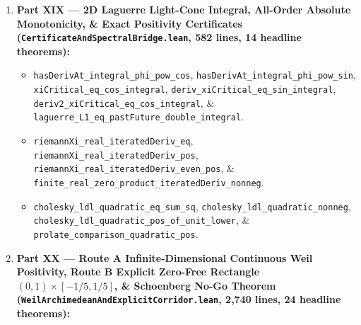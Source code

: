 \documentclass[
  11pt,
]{article}
\providecommand{\tightlist}{%
  \setlength{\itemsep}{0pt}\setlength{\parskip}{0pt}}
\begin{document}
\begin{enumerate}
  \begin{itemize}
  \tightlist
  \item
    \texttt{pos\_integral\_phi\_pow\_cosh},
    \texttt{pos\_integral\_phi\_pow\_sinh},
    \texttt{hasDerivAt\_integral\_phi\_pow\_cosh},
    \texttt{hasDerivAt\_integral\_phi\_pow\_sinh},
    \texttt{riemannXi\_real\_pos},
    \texttt{xiNormSq\_deriv\_sigma\_pos\_realAxis},
    \texttt{xiNormSq\_deriv2\_sigma\_pos\_realAxis},
    \texttt{laguerre\_L1\_pos\_at\_origin},
    \texttt{xiNormSq\_deriv3\_sigma\_pos\_realAxis},
    \texttt{exists\_unconditional\_convex\_corridor}, \&
    \texttt{exists\_unconditional\_corridor\_force\_pos\_and\_no\_offLine\_zeros}.
  \item
    \texttt{prolate\_integration\_by\_parts},
    \texttt{prolate\_symmetric}, \texttt{prolate\_quadratic\_nonneg},
    \texttt{prolate\_quadratic\_pos\_of\_ne\_zero},
    \texttt{prolate\_eigenvalue\_pos},
    \texttt{prolate\_eigenvectors\_orthogonal},
    \texttt{darboux\_supersymmetric\_factorization}, \&
    \texttt{darboux\_supersymmetric\_nonneg}.
  \end{itemize}
\item
  \textbf{Part XIX --- 2D Laguerre Light-Cone Integral, All-Order
  Absolute Monotonicity, \& Exact Positivity Certificates
  (\texttt{CertificateAndSpectralBridge.lean}, 582 lines, 14 headline
  theorems):}

  \begin{itemize}
  \tightlist
  \item
    \texttt{hasDerivAt\_integral\_phi\_pow\_cos},
    \texttt{hasDerivAt\_integral\_phi\_pow\_sin},
    \texttt{xiCritical\_eq\_cos\_integral},
    \texttt{deriv\_xiCritical\_eq\_sin\_integral},
    \texttt{deriv2\_xiCritical\_eq\_cos\_integral}, \&
    \texttt{laguerre\_L1\_eq\_pastFuture\_double\_integral}.
  \item
    \texttt{riemannXi\_real\_iteratedDeriv\_eq},
    \texttt{riemannXi\_real\_iteratedDeriv\_pos},
    \texttt{riemannXi\_real\_iteratedDeriv\_even\_pos}, \&
    \texttt{finite\_real\_zero\_product\_iteratedDeriv\_nonneg}.
  \item
    \texttt{cholesky\_ldl\_quadratic\_eq\_sum\_sq},
    \texttt{cholesky\_ldl\_quadratic\_nonneg},
    \texttt{cholesky\_ldl\_quadratic\_pos\_of\_unit\_lower}, \&
    \texttt{prolate\_comparison\_quadratic\_pos}.
  \end{itemize}
\item
  \textbf{Part XX --- Route A Infinite-Dimensional Continuous Weil
  Positivity, Route B Explicit Zero-Free Rectangle
  \((0, 1) \times [-1/5, 1/5]\), \& Schoenberg No-Go Theorem
  (\texttt{WeilArchimedeanAndExplicitCorridor.lean}, 2,740 lines, 24
  headline theorems):}


\end{enumerate}
\end{document}
